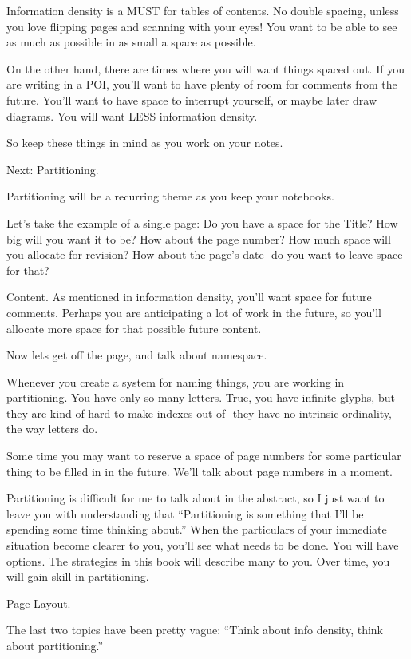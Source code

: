 \documentclass[oneside]{book}
\begin{document}
Information density is a MUST for tables of contents. No double
spacing, unless you love flipping pages and scanning with your eyes!
You want to be able to see as much as possible in as small a space as
possible.

On the other hand, there are times where you will want things spaced
out. If you are writing in a POI, you'll want to have plenty of room
for comments from the future. You'll want to have space to interrupt
yourself, or maybe later draw diagrams. You will want LESS information
density.

So keep these things in mind as you work on your notes.

Next: Partitioning.

Partitioning will be a recurring theme as you keep your
notebooks.

Let's take the example of a single page: Do you have a space for the
Title? How big will you want it to be? How about the page number? How
much space will you allocate for revision? How about the page's date-
do you want to leave space for that?

Content. As mentioned in information density, you'll want space for
future comments. Perhaps you are anticipating a lot of work in the
future, so you'll allocate more space for that possible future
content.

Now lets get off the page, and talk about namespace.

Whenever you create a system for naming things, you are working in
partitioning. You have only so many letters. True, you have infinite
glyphs, but they are kind of hard to make indexes out of- they have no
intrinsic ordinality, the way letters do.

Some time you may want to reserve a space of page numbers for some
particular thing to be filled in in the future. We'll talk about page
numbers in a moment.

Partitioning is difficult for me to talk about in the abstract, so I
just want to leave you with understanding that ``Partitioning is
something that I'll be spending some time thinking about.'' When the
particulars of your immediate situation become clearer to you, you'll
see what needs to be done. You will have options. The strategies in
this book will describe many to you. Over time, you will gain skill in
partitioning.

Page Layout.

The last two topics have been pretty vague: ``Think about info density,
think about partitioning.''
\end{document}
